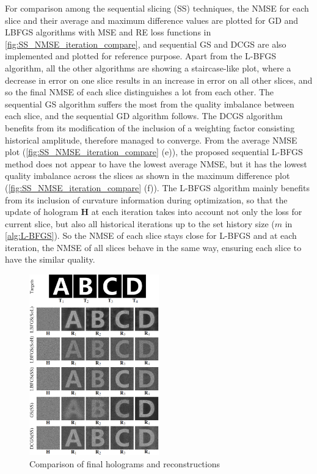 For comparison among the sequential slicing (SS) techniques, the NMSE for each slice and their average and maximum difference values are plotted for GD and LBFGS algorithms with MSE and RE loss functions in \cref{fig:SS_NMSE_iteration_compare}, and sequential GS and DCGS \cite{Zhou2019} are also implemented and plotted for reference purpose. Apart from the L-BFGS algorithm, all the other algorithms are showing a staircase-like plot, where a decrease in error on one slice results in an increase in error on all other slices, and so the final NMSE of each slice distinguishes a lot from each other. The sequential GS algorithm suffers the most from the quality imbalance between each slice, and the sequential GD algorithm follows. The DCGS algorithm benefits from its modification of the inclusion of a weighting factor consisting historical amplitude, therefore managed to converge. From the average NMSE plot (\cref{fig:SS_NMSE_iteration_compare} (e)), the proposed sequential L-BFGS method does not appear to have the lowest average NMSE, but it has the lowest quality imbalance across the slices as shown in the maximum difference plot (\cref{fig:SS_NMSE_iteration_compare} (f)). The L-BFGS algorithm mainly benefits from its inclusion of curvature information during optimization, so that the update of hologram $\textbf{H}$ at each iteration takes into account not only the loss for current slice, but also all historical iterations up to the set history size ($m$ in \cref{alg:L-BFGS}). So the NMSE of each slice stays close for L-BFGS and at each iteration, the NMSE of all slices behave in the same way, ensuring each slice to have the similar quality.


\begin{figure}[h!]
	\centering
	\includegraphics[width=0.5\textwidth]{final_holograms_reconstructions_4_slice}
	\caption{Comparison of final holograms and reconstructions}
	\label{fig:3D_ABCD}
\end{figure}

